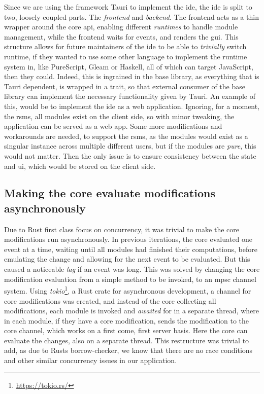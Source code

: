 Since we are using the framework Tauri to implement the \gls*{ide}, the \gls*{ide}
is split to two, loosely coupled parts. The \textit{frontend} and
\textit{backend}. The frontend acts as a thin wrapper around the core \gls*{api},
enabling different \textit{runtimes} to handle module management, while the
frontend waits for events, and renders the \gls*{gui}. This structure allows for
future maintainers of the \gls*{ide} to be able to \textit{trivially} switch
runtime, if they wanted to use some other language to implement the runtime
system in, like PureScript, Gleam or Haskell, all of which can target
JavaScript, then they could. Indeed, this is ingrained in the base library, as
everything that is Tauri dependent, is wrapped in a trait, so that external
consumer of the base library can implement the necessary functionality given by
Tauri. An example of this, would be to implement the \gls*{ide} as a web
application. Ignoring, for a moment, the \gls*{rsms}, all modules exist on the
client side, so with minor tweaking, the application can be served as a web
app. Some more modifications and workarounds are needed, to support the
\gls*{rsms}, as the modules would exist as a singular instance across multiple
different users, but if the modules are \textit{pure}, this would not matter.
Then the only issue is to ensure consistency between the state and \gls*{ui},
which would be stored on the client side.

\subsection{Making the core evaluate modifications asynchronously}

Due to Rust first class focus on concurrency, it was trivial to make the core
modifications run asynchronously. In previous iterations, the core evaluated
one event at a time, waiting until all modules had finished their computations,
before emulating the change and allowing for the next event to be evaluated. But
this caused a noticeable \textit{lag} if an event was long. This was solved by
changing the core modification evaluation from a simple method to be invoked, to
an \gls*{mpsc} channel system. Using \textit{tokio}\footnote{\url{https://tokio.rs/}},
a Rust crate for asynchronous development, a channel for core modifications was
created, and instead of the core collecting all modifications, each module is
invoked and \textit{awaited} for in a separate thread, where in each module, if
they have a core modification, sends the modification to the core channel, which
works on a first come, first server basis. Here the core can evaluate the
changes, also on a separate thread. This restructure was trivial to add, as due
to Rusts borrow-checker, we know that there are no race conditions and other
similar concurrency issues in our application.


